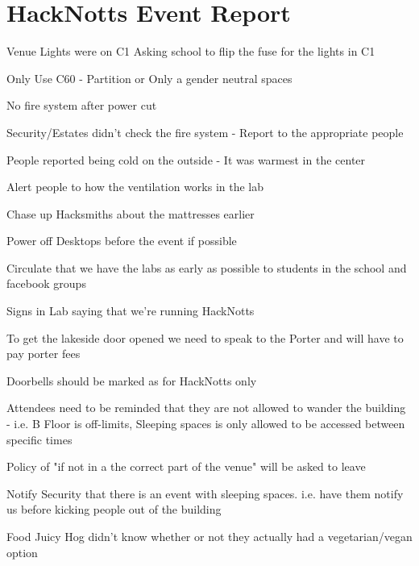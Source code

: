 \documentclass[11pt,hacksoc]{meetingmins}
\begin{document}
\maketitle

\section{HackNotts Event Report}
\begin{items}
\item
Venue
	\subitem
	Lights were on C1
		\subsubitem
		Asking school to flip the fuse for the lights in C1
		
		\subsubitem
		Only Use C60 - Partition or Only a gender neutral spaces
		
	\subitem
	No fire system after power cut
	
		\subsubitem
		Security/Estates didn't check the fire system - Report to the appropriate people
	
	\subitem
	People reported being cold on the outside - It was warmest in the center
	
		\subsubitem
		Alert people to how the ventilation works in the lab
		
	\subitem
	Chase up Hacksmiths about the mattresses earlier
	
	\subitem
	Power off Desktops before the event if possible
	
	\subitem
	Circulate that we have the labs as early as possible to students in the school and facebook groups
	
	\subitem
	Signs in Lab saying that we're running HackNotts
	
	\subitem
	To get the lakeside door opened we need to speak to the Porter and will have to pay porter fees
	
	\subitem
	Doorbells should be marked as for HackNotts only
	
	\subitem
	Attendees need to be reminded that they are not allowed to wander the building - i.e. B Floor is off-limits, Sleeping spaces is only allowed to be accessed between specific times
	
	\subitem
	Policy of "if not in a the correct part of the venue" will be asked to leave
	
	\subitem
	Notify Security that there is an event with sleeping spaces. i.e. have them notify us before kicking people out of the building
		
\item
Food
	\subitem
	Juicy Hog didn't know whether or not they actually had a vegetarian/vegan option
		

\end{items}
\end{document}
